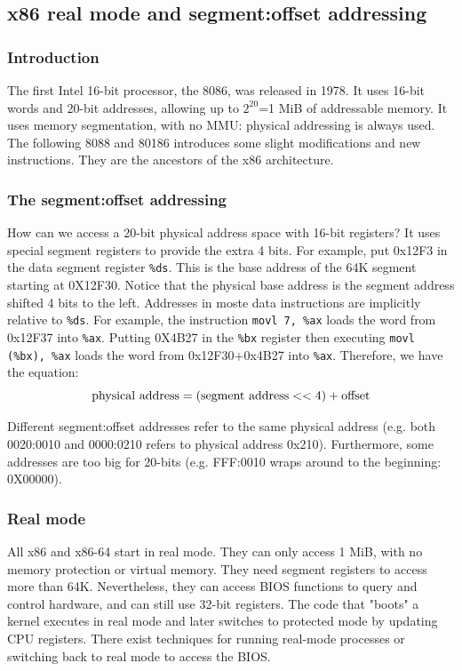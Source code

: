\documentclass[toc]{../cs-classes/cs-classes}
\begin{document}
\subsection{x86 real mode and segment:offset addressing}
\subsubsection{Introduction}
The first Intel 16-bit processor, the 8086, was released in 1978. It uses 16-bit words and 20-bit addresses, allowing up to $2^{20}$=1 MiB of addressable memory. It uses memory segmentation, with no MMU: physical addressing is always used. The following 8088 and 80186 introduces some slight modifications and new instructions. They are the ancestors of the x86 architecture.

\subsubsection{The segment:offset addressing}
How can we access a 20-bit physical address space with 16-bit registers? It uses special segment registers to provide the extra 4 bits. For example, put 0x12F3 in the data segment register \texttt{\%ds}. This is the base address of the 64K segment starting at 0X12F30. Notice that the physical base address is the segment address shifted 4 bits to the left. Addresses in moste data instructions are implicitly relative to \texttt{\%ds}. For example, the instruction \texttt{movl 7, \%ax} loads the word from 0x12F37 into \texttt{\%ax}. Putting 0X4B27 in the \texttt{\%bx} register then executing \texttt{movl (\%bx), \%ax} loads the word from 0x12F30+0x4B27 into \texttt{\%ax}. Therefore, we have the equation:
\begin{equation*}
    \textnormal{physical address} = (\textnormal{segment address} << 4) + \textnormal{offset}
\end{equation*}

Different segment:offset addresses refer to the same physical address (e.g. both 0020:0010 and 0000:0210 refers to physical address 0x210). Furthermore, some addresses are too big for 20-bits (e.g. FFF:0010 wraps around to the beginning: 0X00000).

\subsubsection{Real mode}
All x86 and x86-64 start in real mode. They can only access 1 MiB, with no memory protection or virtual memory. They need segment registers to access more than 64K. Nevertheless, they can access BIOS functions to query and control hardware, and can still use 32-bit registers. The code that "boots" a kernel executes in real mode and later switches to protected mode by updating CPU registers. There exist techniques for running real-mode processes or switching back to real mode to access the BIOS.
\end{document}
